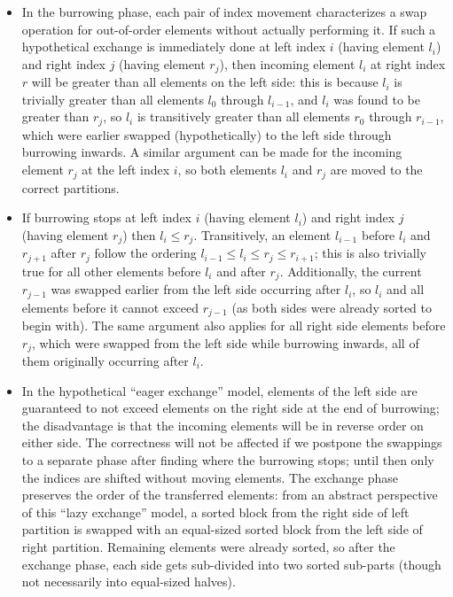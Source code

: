 \begin{itemize}

\item In the burrowing phase, each pair of index movement characterizes a
swap operation for out-of-order elements without actually performing it.
If such a hypothetical exchange is immediately done at left index $i$ (having
element $l_i$) and right index $j$ (having element $r_j$), then incoming element
$l_i$ at right index $r$ will be greater than all elements on the left side:
this is because $l_i$ is trivially greater than all elements $l_0$ through
$l_{i - 1}$, and $l_i$ was found to be greater than $r_j$, so $l_i$ is
transitively greater than all elements $r_0$ through $r_{i - 1}$, which were
earlier swapped (hypothetically) to the left side through burrowing inwards.
A similar argument can be made for the incoming element $r_j$ at the left index
$i$, so both elements $l_i$ and $r_j$ are moved to the correct partitions.

\item If burrowing stops at left index $i$ (having element $l_i$)
and right index $j$ (having element $r_j$) then $l_i \le r_j$.
Transitively, an element $l_{i - 1}$ before $l_i$ and $r_{j + 1}$ after
$r_j$ follow the ordering $l_{i - 1} \le l_i \le r_j \le r_{i + 1}$; this
is also trivially true for all other elements before $l_i$ and after $r_j$.
Additionally, the current $r_{j - 1}$ was swapped earlier from the left
side occurring after $l_i$, so $l_i$ and all elements before it cannot
exceed $r_{j - 1}$ (as both sides were already sorted to begin with).
The same argument also applies for all right side elements
before $r_j$, which were swapped from the left side while
burrowing inwards, all of them originally occurring after $l_i$.

\item In the hypothetical ``eager exchange'' model, elements of the left side are
guaranteed to not exceed elements on the right side at the end of burrowing; the
disadvantage is that the incoming elements will be in reverse order on either side.
The correctness will not be affected if we postpone the swappings
to a separate phase after finding where the burrowing stops;
until then only the indices are shifted without moving elements.
The exchange phase preserves the order of the transferred elements:
from an abstract perspective of this ``lazy exchange'' model,
a sorted block from the right side of left partition is swapped with
an equal-sized sorted block from the left side of right partition.
Remaining elements were already sorted, so after the exchange phase,
each side gets sub-divided into two sorted sub-parts
(though not necessarily into equal-sized halves).

\end{itemize}

